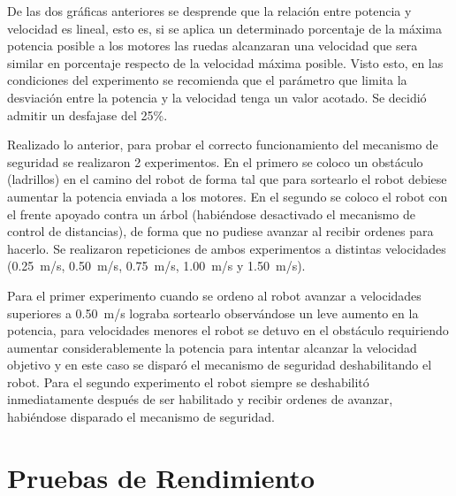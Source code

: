 \documentclass[withindex,glossary]{cam-thesis}
\begin{document}
De las dos gráficas anteriores se desprende que la relación entre potencia y velocidad es lineal, esto es, si se aplica un determinado porcentaje de la máxima potencia posible a los motores las ruedas alcanzaran una velocidad que sera similar en porcentaje respecto de la velocidad máxima posible. Visto esto, en las condiciones del experimento se recomienda que el parámetro que limita la desviación entre la potencia y la velocidad tenga un valor acotado. Se decidió admitir un desfajase del 25\%.

Realizado lo anterior, para probar el correcto funcionamiento del mecanismo de seguridad se realizaron 2 experimentos. En el primero se coloco un obstáculo (ladrillos) en el camino del robot de forma tal que para sortearlo el robot debiese aumentar la potencia enviada a los motores. En el segundo se coloco el robot con el frente apoyado contra un árbol (habiéndose desactivado el mecanismo de control de distancias), de forma que no pudiese avanzar al recibir ordenes para hacerlo. Se realizaron repeticiones de ambos experimentos a distintas velocidades (\SI{0.25}{\metre/\second}, \SI{0.50}{\metre/\second}, \SI{0.75}{\metre/\second}, \SI{1.00}{\metre/\second} y \SI{1.50}{\metre/\second}).

Para el primer experimento cuando se ordeno al robot avanzar a velocidades superiores a \SI{0.50}{\metre/\second} lograba sortearlo observándose un leve aumento en la potencia, para velocidades menores el robot se detuvo en el obstáculo requiriendo aumentar considerablemente la potencia para intentar alcanzar la velocidad objetivo y en este caso se disparó el mecanismo de seguridad deshabilitando el robot. Para el segundo experimento el robot siempre se deshabilitó inmediatamente después de ser habilitado y recibir ordenes de avanzar, habiéndose disparado el mecanismo de seguridad.

\section{Pruebas de Rendimiento}
\end{document}
